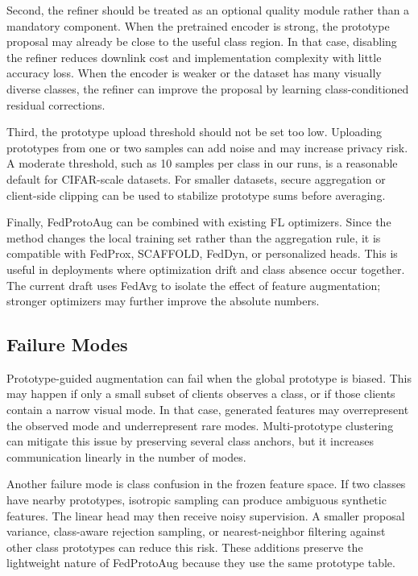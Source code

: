 ﻿\documentclass[runningheads]{llncs}
\newcommand{\method}{FedProtoAug}
\begin{document}
Second, the refiner should be treated as an optional quality module rather than a mandatory component. When the pretrained encoder is strong, the prototype proposal may already be close to the useful class region. In that case, disabling the refiner reduces downlink cost and implementation complexity with little accuracy loss. When the encoder is weaker or the dataset has many visually diverse classes, the refiner can improve the proposal by learning class-conditioned residual corrections.

Third, the prototype upload threshold should not be set too low. Uploading prototypes from one or two samples can add noise and may increase privacy risk. A moderate threshold, such as 10 samples per class in our runs, is a reasonable default for CIFAR-scale datasets. For smaller datasets, secure aggregation or client-side clipping can be used to stabilize prototype sums before averaging.

Finally, \method{} can be combined with existing FL optimizers. Since the method changes the local training set rather than the aggregation rule, it is compatible with FedProx, SCAFFOLD, FedDyn, or personalized heads. This is useful in deployments where optimization drift and class absence occur together. The current draft uses FedAvg to isolate the effect of feature augmentation; stronger optimizers may further improve the absolute numbers.

\subsection{Failure Modes}
Prototype-guided augmentation can fail when the global prototype is biased. This may happen if only a small subset of clients observes a class, or if those clients contain a narrow visual mode. In that case, generated features may overrepresent the observed mode and underrepresent rare modes. Multi-prototype clustering can mitigate this issue by preserving several class anchors, but it increases communication linearly in the number of modes.

Another failure mode is class confusion in the frozen feature space. If two classes have nearby prototypes, isotropic sampling can produce ambiguous synthetic features. The linear head may then receive noisy supervision. A smaller proposal variance, class-aware rejection sampling, or nearest-neighbor filtering against other class prototypes can reduce this risk. These additions preserve the lightweight nature of \method{} because they use the same prototype table.
\end{document}
